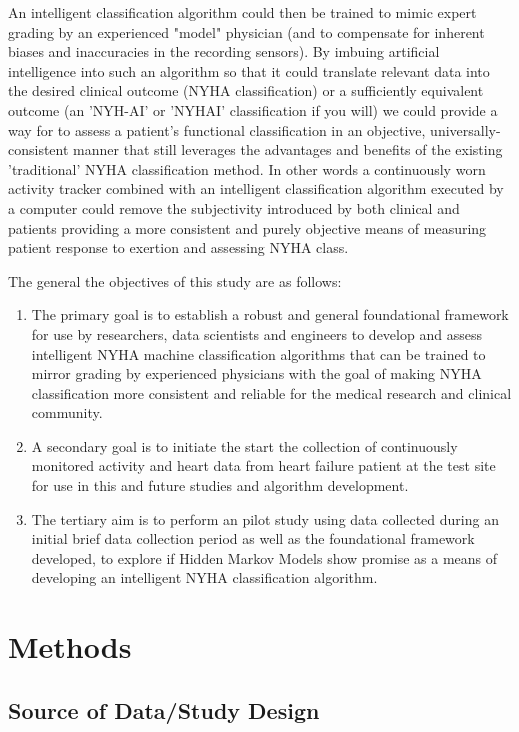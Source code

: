 \documentclass[]{article}
\begin{document}
An intelligent classification algorithm could then be trained to mimic expert grading by an experienced "model" physician (and to compensate for inherent biases and inaccuracies in the recording sensors). By imbuing artificial intelligence into such an algorithm so that it could translate relevant data into the desired clinical outcome (NYHA classification) or a sufficiently equivalent outcome (an 'NYH-AI' or 'NYHAI' classification if you will) we could provide a way for to assess a patient's functional classification in an objective, universally-consistent manner that still leverages the advantages and benefits of the existing 'traditional' NYHA classification method. In other words a continuously worn activity tracker combined with an intelligent classification algorithm executed by a computer could remove the subjectivity introduced by both clinical and patients providing a more consistent and purely objective means of measuring patient response to exertion and assessing NYHA class.

The general the objectives of this study are as follows:
\begin{enumerate}
	\item The primary goal is to establish a robust and general foundational framework for use by researchers, data scientists and engineers to develop and assess intelligent NYHA machine classification algorithms that can be trained to mirror grading by experienced physicians with the goal of making NYHA classification more consistent and reliable for the medical research and clinical community.
	\item A secondary goal is to initiate the start the collection of continuously monitored activity and heart data from heart failure patient at the test site for use in this and future studies and algorithm development.
	\item The tertiary aim is to perform an pilot study using data collected during an initial brief data collection period as well as the foundational framework developed, to explore if Hidden Markov Models show promise as a means of developing an intelligent NYHA classification algorithm.
\end{enumerate}

	
\section{Methods}
\subsection{Source of Data/Study Design} %
\end{document}
